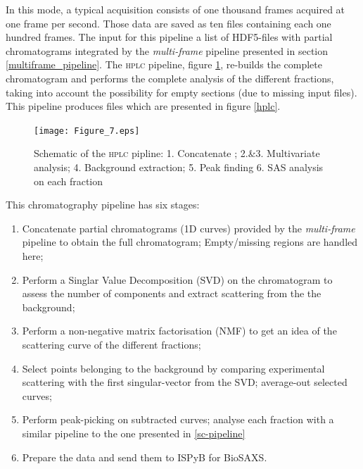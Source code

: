 \documentclass[preprint]{iucr}              %
\begin{document}
In this mode, a typical acquisition consists of one thousand frames acquired at one frame per second.
Those data are saved as ten files containing each one hundred frames.
The input for this pipeline a list of HDF5-files with partial chromatograms integrated by the \textit{multi-frame} pipeline presented in section \ref{multiframe_pipeline}. 
The \textsc{hplc} pipeline, figure \ref{hplc_worflow}, re-builds the complete chromatogram and performs the complete analysis of the different fractions, taking into account the possibility for empty sections (due to missing input files).
This pipeline produces files which are presented in figure \ref{hplc}.
\begin{figure}
\label{hplc_worflow}
\texttt{[image: Figure\_7.eps]}
\caption{Schematic of the \textsc{hplc} pipline: 
1. Concatenate ;
2.\&3. Multivariate analysis;
4. Background extraction;
5. Peak finding
6. SAS analysis on each fraction}
\end{figure}

This chromatography pipeline has six stages:
\begin{enumerate}
    \item Concatenate partial chromatograms (1D curves) provided by the \textit{multi-frame} pipeline to obtain the full chromatogram; Empty/missing regions are handled here;
    \item Perform a Singlar Value Decomposition (SVD) on the chromatogram to assess the number of components and extract scattering from the the background; 
    \item Perform a non-negative matrix factorisation (NMF) to get an idea of the scattering curve of the different fractions; 
    \item Select points belonging to the background by comparing experimental scattering with the first singular-vector from the SVD; average-out selected curves; %
    \item Perform peak-picking on subtracted curves; analyse each fraction with a similar pipeline to the one presented in \ref{sc-pipeline} %
    \item Prepare the data and send them to ISPyB for BioSAXS.
\end{enumerate}
\end{document}

